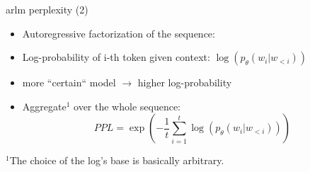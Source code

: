 \begin{frame}{arlm perplexity (2)}

\vfill
\begin{itemize}
	\item Autoregressive factorization of the sequence:
\end{itemize}

\begin{figure}
    \centering
\end{figure}

\begin{itemize}
	\item Log-probability of i-th token given context: $\log(p_\theta(w_i|w_{<i}))$
	\item[] more ``certain`` model $\to$ higher log-probability
	\item Aggregate$^1$ over the whole sequence:
				$$PPL = \exp\left(- \frac{1}{t} \sum_{i=1}^t \log(p_\theta(w_i|w_{<i}))\right)$$
\end{itemize}

\vfill

\footnotesize{$^1$The choice of the log’s base is basically arbitrary.}

\end{frame}


